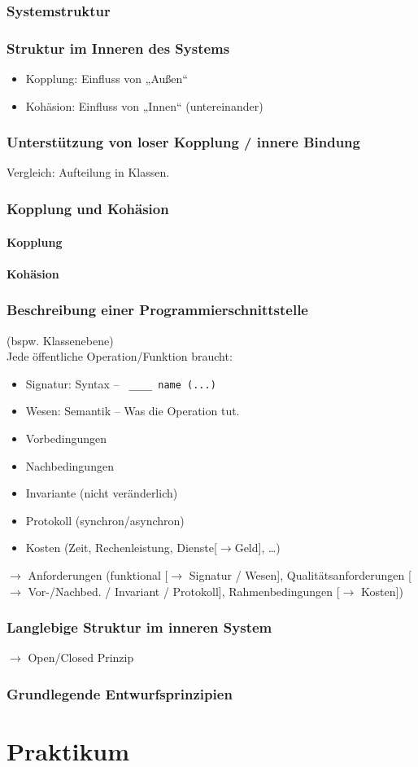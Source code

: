 \documentclass{scrreprt}
\begin{document}
\section{Systemstruktur}
\section{Struktur im Inneren des Systems}
\begin{itemize}
\item Kopplung: Einfluss von „Außen“
\item Kohäsion: Einfluss von „Innen“ (untereinander)
\end{itemize}
\section{Unterstützung von loser Kopplung / innere Bindung}
Vergleich: Aufteilung in Klassen.
\section{Kopplung und Kohäsion}
\subsection{Kopplung}
\subsection{Kohäsion}
\section{Beschreibung einer Programmierschnittstelle}
(bspw. Klassenebene)\\
Jede öffentliche Operation/Funktion braucht:
\begin{itemize}
\item Signatur: Syntax -- \lstinline$ ____ name (...)$
\item Wesen: Semantik -- Was die Operation tut.
\item Vorbedingungen
\item Nachbedingungen
\item Invariante (nicht veränderlich)
\item Protokoll (synchron/asynchron)
\item Kosten (Zeit, Rechenleistung, Dienste[$\to$Geld], …)
\end{itemize}
$\to$ Anforderungen (funktional [$\to$ Signatur / Wesen], Qualitätsanforderungen [$\to$ Vor-/Nachbed. / Invariant / Protokoll], Rahmenbedingungen [$\to$ Kosten])
\section{Langlebige Struktur im inneren System}
$\to$ Open/Closed Prinzip
\section{Grundlegende Entwurfsprinzipien}

\part{Praktikum}
\setcounter{chapter}{0}

\end{document}
